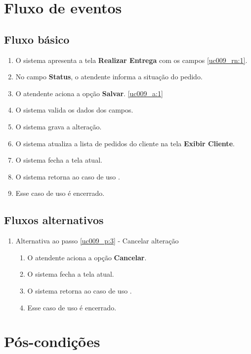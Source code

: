 \section{Fluxo de eventos}

\subsection{Fluxo básico}

\begin{enumerate}[label=P\arabic*]
	\item O sistema apresenta a tela \textbf{Realizar Entrega} com os campos \ref{uc009_rn:1}. \label{uc009_p:1}
	\item No campo \textbf{Status}, o atendente informa a situação do pedido. \label{uc009_p:2}		
	\item O atendente aciona a opção \textbf{Salvar}. \label{uc009_p:3}\ref{uc009_a:1}
	\item O sistema valida os dados dos campos. 
	\item O sistema grava a alteração.
	\item O sistema atualiza a lista de pedidos do cliente na tela \textbf{Exibir Cliente}.
	\item O sistema fecha a tela atual.
	\item O sistema retorna ao caso de uso .
	\item Esse caso de uso é encerrado.	
\end{enumerate}

\subsection{Fluxos alternativos}

\begin{enumerate}[label=A\arabic*]
	\item Alternativa ao passo \ref{uc009_p:3} - Cancelar alteração \label{uc009_a:1}
	\begin{enumerate}[label*=.\arabic*]
		\item O atendente aciona a opção \textbf{Cancelar}.
		\item O sistema fecha a tela atual.
		\item O sistema retorna ao caso de uso .
		\item Esse caso de uso é encerrado.
	\end{enumerate} 
\end{enumerate}

\section{Pós-condições}

